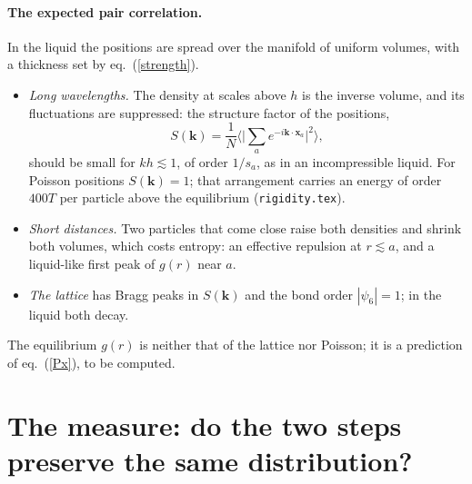 \documentclass[11pt,aps,preprint,nofootinbib,superscriptaddress,tightenlines]{revtex4-2}
\def\st{\begin{equation}}
\def\stp{\end{equation}}
\def\Eq#1{eq.~(\ref{#1})}
\let\oldparagraph\paragraph
\renewcommand{\paragraph}{\par\bigskip\oldparagraph}
\begin{document}
\paragraph{The expected pair correlation.}  In the liquid the positions are spread over the manifold of uniform volumes,
with a thickness set by \Eq{strength}.
\begin{itemize}
\item \emph{Long wavelengths.}  The density at scales above $h$ is the inverse volume, and its fluctuations are suppressed:
  the structure factor of the positions,
  \st
  S(\bm k)=\frac1N\Big\langle\Big|\sum_ae^{-i\bm k\cdot\bm x_a}\Big|^2\Big\rangle ,
  \stp
  should be small for $kh\lesssim1$, of order $1/s_a$, as in an incompressible liquid.  For Poisson positions $S(\bm k)=1$; that
  arrangement carries an energy of order $400T$ per particle above the equilibrium (\texttt{rigidity.tex}).
\item \emph{Short distances.}  Two particles that come close raise both densities and shrink both volumes, which costs
  entropy: an effective repulsion at $r\lesssim a$, and a liquid-like first peak of $g(r)$ near $a$.
\item \emph{The lattice} has Bragg peaks in $S(\bm k)$ and the bond order $|\psi_6|=1$; in the liquid both decay.
\end{itemize}
The equilibrium $g(r)$ is neither that of the lattice nor Poisson; it is a prediction of \Eq{Px}, to be computed.

\section{The measure: do the two steps preserve the same distribution?}
\label{sec:measure}
\end{document}
